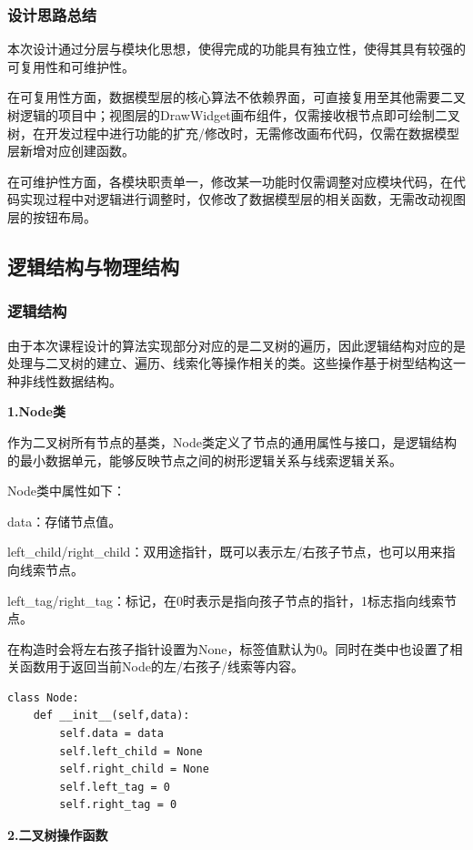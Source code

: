 \documentclass[12pt,a4paper]{article}
\begin{document}
\subsubsection {设计思路总结}
本次设计通过分层与模块化思想，使得完成的功能具有独立性，使得其具有较强的可复用性和可维护性。

在可复用性方面，数据模型层的核心算法不依赖界面，可直接复用至其他需要二叉树逻辑的项目中；视图层的DrawWidget画布组件，仅需接收根节点即可绘制二叉树，在开发过程中进行功能的扩充/修改时，无需修改画布代码，仅需在数据模型层新增对应创建函数。

在可维护性方面，各模块职责单一，修改某一功能时仅需调整对应模块代码，在代码实现过程中对逻辑进行调整时，仅修改了数据模型层的相关函数，无需改动视图层的按钮布局。

\subsection{逻辑结构与物理结构}

\subsubsection{逻辑结构}

由于本次课程设计的算法实现部分对应的是二叉树的遍历，因此逻辑结构对应的是处理与二叉树的建立、遍历、线索化等操作相关的类。这些操作基于树型结构这一种非线性数据结构。

\noindent\textbf {1.Node类}

作为二叉树所有节点的基类，Node类定义了节点的通用属性与接口，是逻辑结构的最小数据单元，能够反映节点之间的树形逻辑关系与线索逻辑关系。

Node类中属性如下：

data：存储节点值。

left\_child/right\_child：双用途指针，既可以表示左/右孩子节点，也可以用来指向线索节点。

left\_tag/right\_tag：标记，在0时表示是指向孩子节点的指针，1标志指向线索节点。

在构造时会将左右孩子指针设置为None，标签值默认为0。同时在类中也设置了相关函数用于返回当前Node的左/右孩子/线索等内容。

\begin{verbatim}
class Node:
    def __init__(self,data):
        self.data = data
        self.left_child = None
        self.right_child = None
        self.left_tag = 0
        self.right_tag = 0
\end{verbatim}

\noindent\textbf {2.二叉树操作函数}
\end{document}
